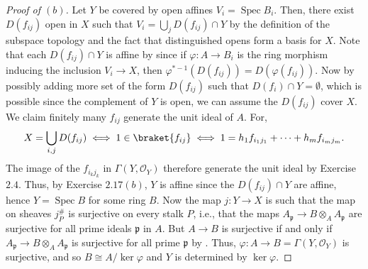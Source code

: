 \documentclass[10pt]{article}
\theoremstyle{definition}
\theoremstyle{remark}
\numberwithin{equation}{section}
\numberwithin{figure}{subsubsection}
\DeclareMathOperator{\Spec}{Spec}
\newcommand{\OO}{\mathcal{O}}
\begin{document}
\begin{proof}[Proof of $(b)$]
  Let $Y$ be covered by open affines $V_i = \Spec B_i$. Then, there exist
  $D(f_{ij})$ open in $X$ such that $V_i = \bigcup_j D(f_{ij}) \cap Y$ by the
  definition of the subspace topology and the fact that distinguished opens form
  a basis for $X$. Note that each $D(f_{ij}) \cap Y$ is affine by \cite[Exc.\
  $1.21i$]{AM69} since if $\varphi\colon A \to B_i$
  is the ring morphism inducing the inclusion $V_i \to X$, then
  $\varphi^{*-1}(D(f_{ij})) = D(\varphi(f_{ij}))$.
  Now by possibly adding more set of the form $D(f_{ij})$ such that
  $D(f_i) \cap Y = \emptyset$, which is possible since the complement of $Y$ is
  open, we can assume the $D(f_{ij})$ cover $X$. We claim finitely many
  $f_{ij}$ generate the unit ideal of $A$. For,
  \begin{equation*}
    X = \bigcup_{i,j} D(f_{ij}) \iff 1 \in \braket{f_{ij}} \iff 1 =
    h_1f_{i_1j_1} + \cdots + h_mf_{i_mj_m}.
  \end{equation*}
  The image of the $f_{i_kj_k}$ in $\Gamma(Y,\OO_Y)$ therefore generate the unit
  ideal by Exercise $2.4$. Thus, by Exercise $2.17(b)$, $Y$ is affine since the
  $D(f_{ij}) \cap Y$ are affine, hence $Y = \Spec B$ for some ring $B$. Now the map
  $j\colon Y \to X$ is such that the map on sheaves $j^\#_P$ is surjective on every
  stalk $P$, i.e., that the maps $A_{\mathfrak{p}} \to B \otimes_A
  A_\mathfrak{p}$ are surjective for all prime ideals $\mathfrak{p}$ in $A$. But
  $A \to B$ is surjective if and only if $A_{\mathfrak{p}} \to B \otimes_A
  A_\mathfrak{p}$ is surjective for all prime $\mathfrak{p}$ by
  \cite[Prop.\ 3.9]{AM69}. Thus, $\varphi\colon A \to B = \Gamma(Y,\OO_Y)$ is
  surjective, and so $B \cong A/\ker\varphi$ and $Y$ is determined by
  $\ker\varphi$.
\end{proof}
\end{document}

